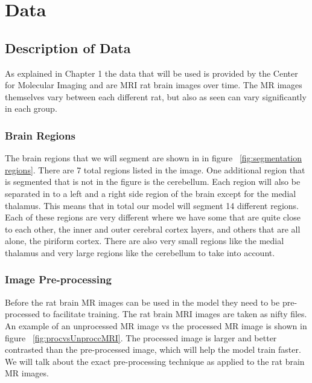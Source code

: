 \chapter{Data}
    
\section{Description of Data}
    As explained in Chapter 1 the data that will be used is provided by the Center for Molecular Imaging and are MRI rat brain images over time. 
    The MR images themselves vary between each different rat, but also as seen can vary significantly in each group.
\subsection{Brain Regions}
    The brain regions that we will segment are shown in in figure ~\ref{fig:segmentation regions}. 
    There are 7 total regions listed in the image. 
    One additional region that is segmented that is not in the figure is the cerebellum. 
    Each region will also be separated in to a left and a right side region of the brain except for the medial thalamus. 
    This means that in total our model will segment 14 different regions. 
    Each of these regions are very different where we have some that are quite close to each other, the inner and outer cerebral cortex layers, and others that are all alone, the piriform cortex. 
    There are also very small regions like the medial thalamus and very large regions like the cerebellum to take into account. 
    


    

\subsection{Image Pre-processing}
    Before the rat brain MR images can be used in the model they need to be pre-processed to facilitate training. 
    The rat brain MRI images are taken as nifty files. 
    An example of an unprocessed MR image vs the processed MR image is shown in figure ~\ref{fig:procvsUnproccMRI}.
    The processed image is larger and better contrasted than the pre-processed image, which will help the model train faster.
    We will talk about the exact pre-processing technique as applied to the rat brain MR images.
    
